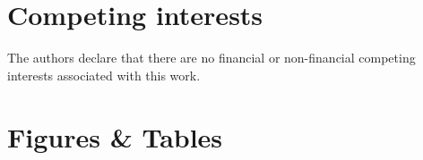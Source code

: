 \documentclass[fleqn,10pt]{wlscirep}
\newcommand{\todo}[1]{{\color{red} #1}}
\begin{document}




\section*{Competing interests}

The authors declare that there are no financial or non-financial competing interests associated with this work.


\section*{Figures \& Tables}



\end{document}
